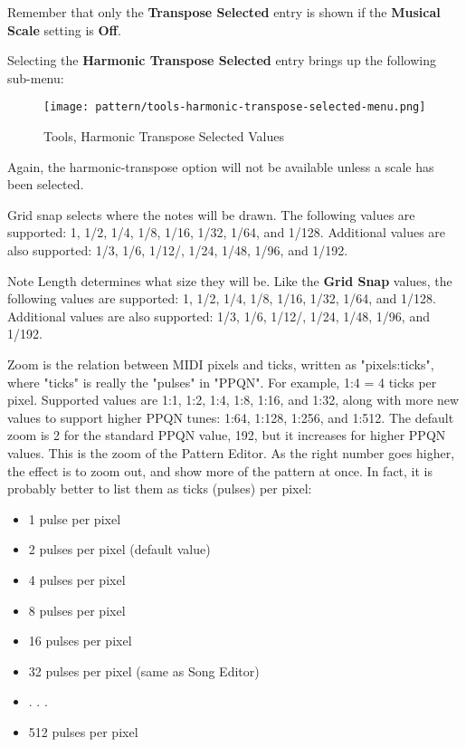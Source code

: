    Remember that only the \textbf{Transpose Selected} entry is shown if the
   \textbf{Musical Scale} setting is \textbf{Off}.

   Selecting the \textbf{Harmonic Transpose Selected} entry brings up the
   following sub-menu:

\begin{figure}[H]
   \centering 
   \texttt{[image: pattern/tools-harmonic-transpose-selected-menu.png]}
   \caption{Tools, Harmonic Transpose Selected Values}
   \label{fig:pattern_editor_tools_harmonic_transpose_menu}
\end{figure}

   Again, the harmonic-transpose option will not be available unless a scale
   has been selected.

   Grid snap selects where the notes will be drawn.
   The following values are supported:
   1, 1/2, 1/4, 1/8, 1/16, 1/32, 1/64, and 1/128.
   Additional values are also supported:
   1/3, 1/6, 1/12/, 1/24, 1/48, 1/96, and 1/192.

   Note Length determines what size they will be.
   Like the \textbf{Grid Snap} values,
   the following values are supported:
   1, 1/2, 1/4, 1/8, 1/16, 1/32, 1/64, and 1/128.
   Additional values are also supported:
   1/3, 1/6, 1/12/, 1/24, 1/48, 1/96, and 1/192.

   Zoom is the relation between MIDI pixels and ticks, written as
   "pixels:ticks", where "ticks" is really the "pulses" in "PPQN".
   For example, 1:4 = 4 ticks per pixel.
   Supported values are 1:1, 1:2, 1:4, 1:8, 1:16, and 1:32, along with
   more new values to support higher PPQN tunes: 1:64, 1:128, 1:256, and
   1:512.
   The default zoom is 2 for the standard PPQN value, 192, but it
   increases for higher PPQN values.
   This is the zoom of the Pattern Editor.  As the right number goes higher,
   the effect is to zoom out, and show more of the pattern at once.
   In fact, it is probably better to list them as ticks (pulses) per pixel:

   \begin{itemize}
      \item 1 pulse per pixel
      \item 2 pulses per pixel (default value)
      \item 4 pulses per pixel
      \item 8 pulses per pixel
      \item 16 pulses per pixel
      \item 32 pulses per pixel (same as Song Editor)
      \item . . .
      \item 512 pulses per pixel
   \end{itemize}

